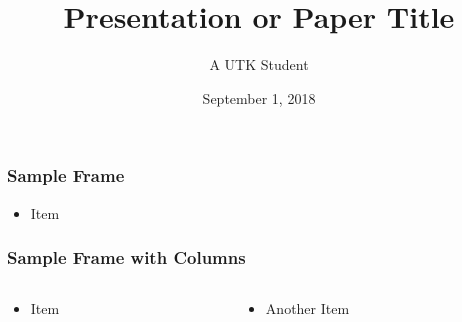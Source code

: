\documentclass{beamer}   %
\author[authors]{A UTK Student}
\institute[utk]{\normalsize Subtitle}
\date{September 1, 2018}
\begin{document}
\title{Presentation or Paper Title\vspace{1\baselineskip}}
\frame{\titlepage}


\begin{frame}[t]
    \frametitle{Sample Frame}
    \begin{itemize}
        \item Item
    \end{itemize}
\end{frame}


\begin{frame}[t]
    \frametitle{Sample Frame with Columns}
    \begin{columns}[t]
        \begin{column}{0.5\linewidth}
            \begin{itemize}
                \item Item
            \end{itemize}
        \end{column}
        \begin{column}{0.5\linewidth}
            \begin{itemize}
                \item Another Item
            \end{itemize}
        \end{column}
    \end{columns}
\end{frame}

\end{document}
